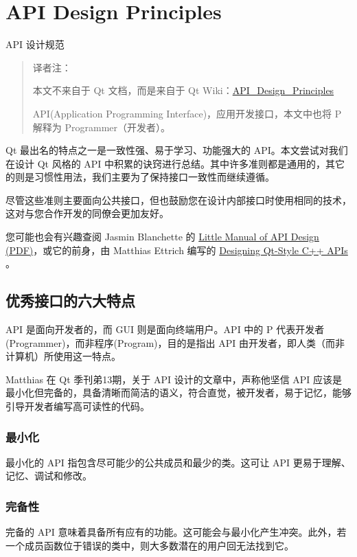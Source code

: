\chapter{API Design Principles}

API 设计规范

\begin{quote}
译者注：

本文不来自于 Qt 文档，而是来自于 Qt Wiki：\href{https://wiki.qt.io/API_Design_Principles}{API\_Design\_Principles}

API(Application Programming Interface)，应用开发接口，本文中也将 P 解释为 Programmer（开发者）。	
\end{quote}

Qt 最出名的特点之一是一致性强、易于学习、功能强大的 API。本文尝试对我们在设计 Qt 风格的 API 中积累的诀窍进行总结。其中许多准则都是通用的，其它的则是习惯性用法，我们主要为了保持接口一致性而继续遵循。

尽管这些准则主要面向公共接口，但也鼓励您在设计内部接口时使用相同的技术，这对与您合作开发的同僚会更加友好。

您可能也会有兴趣查阅 Jasmin Blanchette 的 
\href{https://people.mpi-inf.mpg.de/~jblanche/api-design.pdf}{Little Manual of API Design (PDF)}，或它的前身，由 Matthias Ettrich 编写的 \href{https://doc.qt.io/archives/qq/qq13-apis.html}{Designing Qt-Style C++ APIs} 。

\section{优秀接口的六大特点}

API 是面向开发者的，而 GUI 则是面向终端用户。API 中的 P 代表开发者(Programmer)，而非程序(Program)，目的是指出 API 由开发者，即人类（而非计算机）所使用这一特点。

Matthias 在 Qt 季刊弟13期，关于 API 设计的文章中，声称他坚信 API 应该是最小化但完备的，具备清晰而简洁的语义，符合直觉，被开发者，易于记忆，能够引导开发者编写高可读性的代码。

\subsection{最小化}

最小化的 API 指包含尽可能少的公共成员和最少的类。这可让 API 更易于理解、记忆、调试和修改。

\subsection{完备性}
完备的 API 意味着具备所有应有的功能。这可能会与最小化产生冲突。此外，若一个成员函数位于错误的类中，则大多数潜在的用户回无法找到它。

